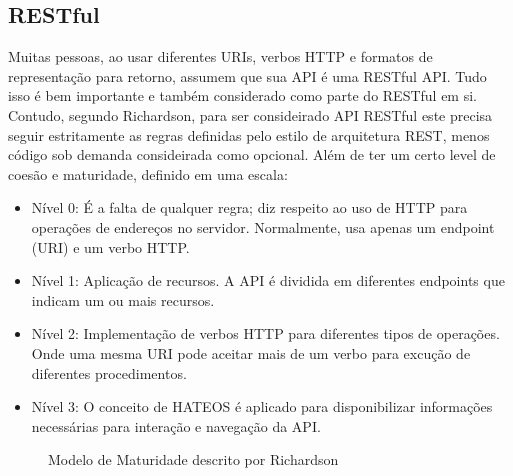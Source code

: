 \subsection[RESTful]{RESTful}

Muitas pessoas, ao usar diferentes URIs, verbos HTTP e formatos de representação para retorno, assumem que sua API é uma RESTful API. Tudo isso é bem importante e também considerado como parte do RESTful em si. Contudo, segundo Richardson, para ser consideirado API RESTful este precisa seguir estritamente as regras definidas pelo estilo de arquitetura REST, menos código sob demanda consideirada como opcional. Além de ter um certo level de coesão e maturidade, definido em uma escala: \cite{RichardsonEtAl2013}

\begin{itemize}[noitemsep]
\item Nível 0: É a falta de qualquer regra; diz respeito ao uso de HTTP para operações de endereços no servidor. Normalmente, usa apenas um endpoint (URI) e um verbo HTTP.
\item Nível 1: Aplicação de recursos. A API é dividida em diferentes endpoints que indicam um ou mais recursos.
\item Nível 2: Implementação de verbos HTTP para diferentes tipos de operações. Onde uma mesma URI pode aceitar mais de um verbo para excução de diferentes procedimentos.
\item Nível 3: O conceito de HATEOS é aplicado para disponibilizar informações necessárias para interação e navegação da API.
\end{itemize}

\begin{figure}[h]
  \centering
  \caption{Modelo de Maturidade descrito por Richardson}
\end{figure}
